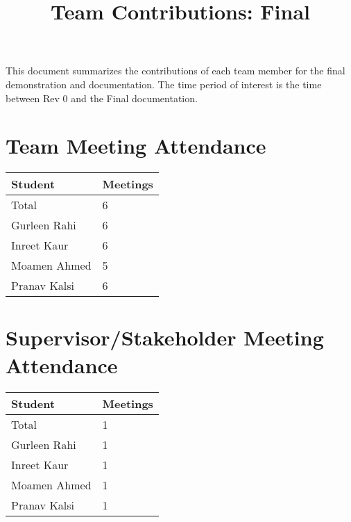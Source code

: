 \documentclass{article}
\title{Team Contributions: Final\\\progname}
\author{\authname}
\date{}
\begin{document}
\maketitle

This document summarizes the contributions of each team member for the final
demonstration and documentation.  The time period of interest is the time
between Rev 0 and the Final documentation.

\section{Team Meeting Attendance}


\begin{table}[H]
\centering
\begin{tabular}{ll}
\toprule
\textbf{Student} & \textbf{Meetings}\\
\midrule
Total & 6\\
Gurleen Rahi & 6 \\
Inreet Kaur & 6 \\
Moamen Ahmed & 5 \\
Pranav Kalsi & 6 \\
\bottomrule
\end{tabular}
\end{table}


\section{Supervisor/Stakeholder Meeting Attendance}



\begin{table}[H]
\centering
\begin{tabular}{ll}
\toprule
\textbf{Student} & \textbf{Meetings}\\
\midrule
Total & 1 \\
Gurleen Rahi & 1\\
Inreet Kaur & 1\\
Moamen Ahmed & 1\\
Pranav Kalsi & 1\\
\bottomrule
\end{tabular}
\end{table}
\end{document}
